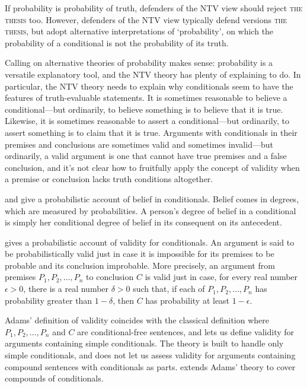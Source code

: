 If probability is probability of truth, defenders of the NTV view should reject \textsc{the thesis} too.  However, defenders of the NTV view typically defend versions \textsc{the thesis}, but adopt alternative interpretations of `probability', on which the probability of a conditional is not the probability of its truth.

Calling on alternative theories of probability makes sense: probability is a versatile explanatory tool, and the NTV theory has plenty of explaining to do.  In particular, the NTV theory needs to explain why conditionals seem to have the features of truth-evaluable statements.  It is sometimes reasonable to believe a conditional---but ordinarily, to believe something is to believe that it is true.  Likewise, it is sometimes reasonable to assert a conditional---but ordinarily, to assert something is to claim that it is true.  Arguments with conditionals in their premises and conclusions are sometimes valid and sometimes invalid---but ordinarily, a valid argument is one that cannot have true premises and a false conclusion, and it's not clear how to fruitfully apply the concept of validity when a premise or conclusion lacks truth conditions altogether.

\citet{Adams1975-ADATLO-4} and \citet{Edgington1986-EDGDCH} give a probabilistic account of belief in conditionals.  Belief comes in degrees, which are measured by probabilities.  A person's degree of belief in a conditional is simply her conditional degree of belief in its consequent on its antecedent.

\citet{Adams1975-ADATLO-4} gives a probabilistic account of validity for conditionals.  An argument is said to be probabilistically valid just in case it is impossible for its premises to be probable and its conclusion improbable.  More precisely, an argument from premises $P_1, P_2,\ldots, P_n$ to conclusion $C$ is valid just in case, for every real number $\epsilon > 0$, there is a real number $\delta > 0$ such that, if each of $P_1, P_2,\ldots, P_n$ has probability greater than $1-\delta$, then $C$ has probability at least $1-\epsilon$.

Adams' definition of validity coincides with the classical definition where $P_1, P_2,\ldots, P_n$ and $C$ are conditional-free sentences, and lets us define validity for arguments containing simple conditionals.  The theory is built to handle only simple conditionals, and does not let us assess validity for arguments containing compound sentences with conditionals as parts.  \citet{McGee1989-MCGCPA} extends Adams' theory to cover compounds of conditionals.

